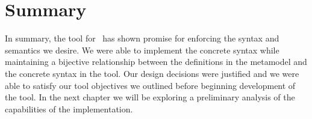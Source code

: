 \section{Summary}
In summary, the tool for \tool\ has shown promise for enforcing the syntax and semantics we desire. We were able to implement the concrete syntax while maintaining a bijective relationship between the definitions in the metamodel and the concrete syntax in the tool. Our design decisions were justified and we were able to satisfy our tool objectives we outlined before beginning development of the tool. In the next chapter we will be exploring a preliminary analysis of the capabilities of the implementation. 
